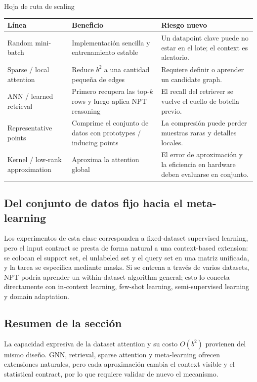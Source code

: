 \begin{knowledgebox}{Hoja de ruta de scaling}
\begin{tabularx}{\textwidth}{L{0.24\textwidth}>{\raggedright\arraybackslash}X >{\raggedright\arraybackslash}X}
\toprule
Línea & Beneficio & Riesgo nuevo \\
\midrule
Random mini-batch & Implementación sencilla y entrenamiento estable & Un datapoint clave puede no estar en el lote; el context es aleatorio. \\
Sparse / local attention & Reduce $b^2$ a una cantidad pequeña de edges & Requiere definir o aprender un candidate graph. \\
ANN / learned retrieval & Primero recupera las top-$k$ rows y luego aplica NPT reasoning & El recall del retriever se vuelve el cuello de botella previo. \\
Representative points & Comprime el conjunto de datos con prototypes / inducing points & La compresión puede perder muestras raras y detalles locales. \\
Kernel / low-rank approximation & Aproxima la attention global & El error de aproximación y la eficiencia en hardware deben evaluarse en conjunto. \\
\bottomrule
\end{tabularx}
\end{knowledgebox}

\subsection{Del conjunto de datos fijo hacia el meta-learning}

Los experimentos de esta clase corresponden a fixed-dataset supervised learning, pero el input contract se presta de forma natural a una context-based extension: se colocan el support set, el unlabeled set y el query set en una matriz unificada, y la tarea se especifica mediante masks. Si se entrena a través de varios datasets, NPT podría aprender un within-dataset algorithm general; esto lo conecta directamente con in-context learning, few-shot learning, semi-supervised learning y domain adaptation.


\subsection{Resumen de la sección}

La capacidad expresiva de la dataset attention y su costo $O(b^2)$ provienen del mismo diseño. GNN, retrieval, sparse attention y meta-learning ofrecen extensiones naturales, pero cada aproximación cambia el context visible y el statistical contract, por lo que requiere validar de nuevo el mecanismo.
